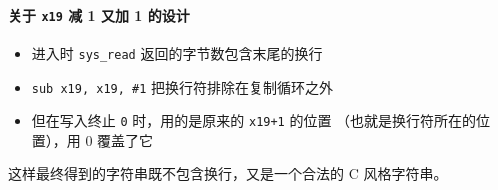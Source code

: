 \paragraph{关于 \texttt{x19} 减 1 又加 1 的设计}
\begin{itemize}
    \item 进入时 \texttt{sys\_read} 返回的字节数包含末尾的换行
    \item \texttt{sub x19, x19, \#1} 把换行符排除在复制循环之外
    \item 但在写入终止 \texttt{0} 时，用的是原来的 \texttt{x19+1} 的位置
        （也就是换行符所在的位置），用 0 覆盖了它
\end{itemize}

这样最终得到的字符串既不包含换行，又是一个合法的 C 风格字符串。
